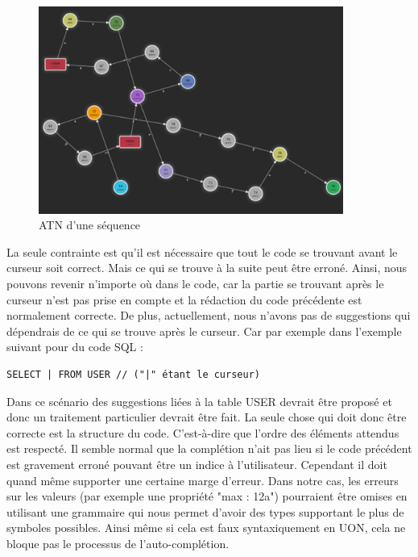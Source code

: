 \documentclass[
    iict, %
    il, %
]{heig-tb}
\begin{document}
\begin{figure}[!ht]
    \begin{center}
        \includegraphics[width=10cm]{assets/figures/seq_ATN.png}
    \end{center}
    \caption[ATN d'une séquence]{\label{seq_ATN} ATN d'une séquence}
\end{figure}

La seule contrainte est qu'il est nécessaire que tout le code se trouvant avant le curseur soit correct. Mais ce qui se trouve à la suite peut être erroné. 
Ainsi, nous pouvons revenir n'importe où dans le code, car la partie se trouvant après le curseur n'est pas prise en compte et la rédaction du code précédente est normalement correcte.
De plus, actuellement, nous n'avons pas de suggestions qui dépendrais de ce qui se trouve après le curseur.
Car par exemple dans l'exemple suivant pour du code SQL :

\begin{lstlisting}
SELECT | FROM USER // ("|" étant le curseur)
\end{lstlisting}

Dans ce scénario des suggestions liées à la table USER devrait être proposé et donc un traitement particulier devrait être fait.
La seule chose qui doit donc être correcte est la structure du code. C'est-à-dire que l'ordre des éléments attendus est respecté.
Il semble normal que la complétion n'ait pas lieu si le code précédent est gravement erroné pouvant être un indice à l'utilisateur. Cependant il doit quand même supporter une certaine marge d'erreur. Dans notre cas, les erreurs sur les valeurs (par exemple une propriété "max : 12a") pourraient être omises en utilisant une grammaire qui nous permet d'avoir des types supportant le plus de symboles possibles. Ainsi même si cela est faux syntaxiquement en UON, cela ne bloque pas le processus de l'auto-complétion.
\end{document}
